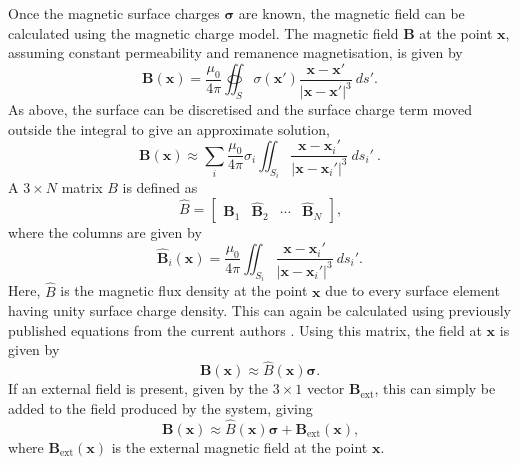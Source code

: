 Once the magnetic surface charges \(\bm{\sigma}\) are known, the magnetic field can be calculated using the magnetic charge model. The magnetic field \(\mathbf{B}\) at the point \(\mathbf{x}\), assuming constant permeability and remanence magnetisation, is given by
\begin{equation}
	\mathbf{B}\left( \mathbf{x} \right) = \frac{\mu_0}{4\pi} \oiint_{S} \sigma \left( \mathbf{x}' \right) \frac{\mathbf{x} - \mathbf{x}'}{\left| \mathbf{x} - \mathbf{x}' \right|^3} \ ds' \text{.}
\end{equation}
As above, the surface can be discretised and the surface charge term moved outside the integral to give an approximate solution,
\begin{equation}
	\mathbf{B}\left( \mathbf{x} \right) \approx \sum_i \frac{\mu_0}{4\pi} \sigma_i \iint_{S_i} \frac{\mathbf{x} - \mathbf{x}_i'}{\left| \mathbf{x} - \mathbf{x}_i' \right|^3} \ ds_i' \ \text{.}
\end{equation}
A \(3 \times N\) matrix \(B\) is defined as
\begin{equation}
    \hat{B} = \begin{bmatrix} \hat{\mathbf{B}}_1 & \hat{\mathbf{B}}_2 & \cdots & \hat{\mathbf{B}}_N \end{bmatrix} \text{,}
\end{equation}
where the columns are given by
\begin{equation}
	\hat{\mathbf{B}}_i\left(\mathbf{x}\right) = \frac{\mu_0}{4\pi} \iint_{S_i} \frac{\mathbf{x} - \mathbf{x}_i'}{\left| \mathbf{x} - \mathbf{x}_i' \right|^3} \ ds_i' \text{.}
\end{equation}
Here, \(\hat{B}\) is the magnetic flux density at the point \(\mathbf{x}\) due to every surface element having unity surface charge density. This can again be calculated using previously published equations from the current authors \cite{OConnell2020a}. Using this matrix, the field at \(\mathbf{x}\) is given by
\begin{equation}
	\mathbf{B}\left(\mathbf{x}\right) \approx \hat{B} \left(\mathbf{x}\right) \bm{\sigma} \text{.}
\end{equation}
If an external field is present, given by the \(3\times 1\) vector \(\mathbf{B}_\text{ext}\), this can simply be added to the field produced by the system, giving
\begin{equation}
    \mathbf{B}\left(\mathbf{x}\right) \approx \hat{B} \left(\mathbf{x}\right) \bm{\sigma} + \mathbf{B}_\text{ext}\left(\mathbf{x}\right) \text{,}
\end{equation}
where \(\mathbf{B}_\text{ext}\left(\mathbf{x}\right)\) is the external magnetic field at the point \(\mathbf{x}\).
